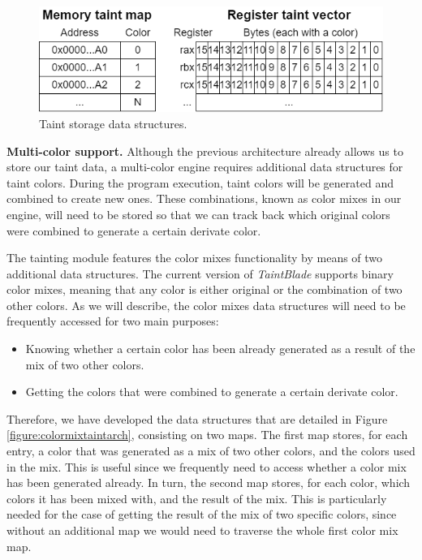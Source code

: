 \documentclass[conference]{IEEEtran}
\begin{document}
\begin{figure}
    \centerline{\includegraphics[width=0.9\columnwidth]{images/TaintingEngine.drawio.png}}
    \caption{Taint storage data structures.}
    \label{figure:taintingengine}
\end{figure}

\textbf{Multi-color support.} Although the previous architecture already allows
us to store our taint data, a multi-color engine requires additional data structures
for taint colors. During the program execution, taint colors will be generated
and combined to create new ones. These combinations, known as color mixes in
our engine, will need to be stored so that we can track back which original colors
were combined to generate a certain derivate color.

The tainting module features the color mixes functionality by means of two
additional data structures. The current version of \textit{TaintBlade} supports
binary color mixes, meaning that any color is either original or the
combination of two other colors. As we will describe, the color mixes data
structures will need to be frequently accessed for two main purposes:
\begin{itemize}
    \item Knowing whether a certain color has been already generated as a result of the
          mix of two other colors.
    \item Getting the colors that were combined to generate a certain derivate color.
\end{itemize}

Therefore, we have developed the data structures that are detailed in Figure
\ref{figure:colormixtaintarch}, consisting on two maps. The first map stores,
for each entry, a color that was generated as a mix of two other colors, and
the colors used in the mix. This is useful since we frequently need to access
whether a color mix has been generated already. In turn, the second map stores,
for each color, which colors it has been mixed with, and the result of the mix.
This is particularly needed for the case of getting the result of the mix of
two specific colors, since without an additional map we would need to traverse
the whole first color mix map.
\end{document}
